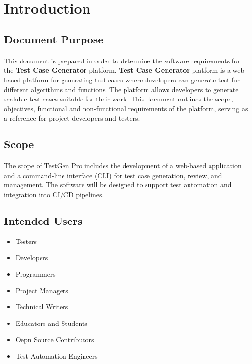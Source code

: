\documentclass{article}
\begin{document}
\section{Introduction}
\subsection{Document Purpose}
\paragraph{}
This document is prepared in order to determine the software requirements for the
\textbf{Test Case Generator} platform. \textbf{Test Case Generator} platform is a
web-based platform for generating test cases where developers can generate test
for different algorithms and functions. The platform allows developers to generate
scalable test cases suitable for their work. This document outlines the scope,
objectives, functional and non-functional requirements of the platform, serving as
a reference for project developers and testers.

\subsection{Scope}
\paragraph{}
The scope of TestGen Pro includes the development of a web-based application and a
command-line interface (CLI) for test case generation, review, and management. The
software will be designed to support test automation and integration into CI/CD
pipelines.

\subsection{Intended Users}
\begin{itemize}
    \item Testers
    \item Developers
    \item Programmers
    \item Project Managers
    \item Technical Writers
    \item Educators and Students
    \item Oepn Source Contributors
    \item Test Automation Engineers
\end{itemize}
\end{document}
